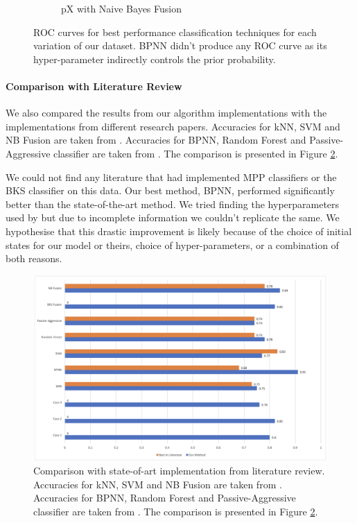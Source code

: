 \documentclass{article}
\begin{document}
\begin{figure}[h]
\begin{subfigure}{.4\columnwidth}
  \caption{pX with Naive Bayes Fusion}
\end{subfigure} \hfill

\caption{ROC curves for best performance classification techniques for each variation of our dataset. BPNN didn’t produce any ROC curve as its hyper-parameter indirectly controls the prior probability.}
\label{fig:grid1}
\end{figure}


\paragraph{Comparison with Literature Review}

We also compared the results from our algorithm implementations with the implementations from different research papers. Accuracies for kNN, SVM and NB Fusion are taken from \citet{gurfidan2021classification}. Accuracies for BPNN, Random Forest and Passive-Aggressive classifier are taken from \citet{chicco2020machine}. The comparison is presented in Figure \ref{fig:comparison}. 

We could not find any literature that had implemented MPP classifiers or the BKS classifier on this data. Our best method, BPNN, performed significantly better than the state-of-the-art method. We tried finding the hyperparameters used by \citet{chicco2020machine} but due to incomplete information we couldn't replicate the same. We hypothesise that this drastic improvement is likely because of the choice of initial states for our model or theirs, choice of hyper-parameters, or a combination of both reasons.

\begin{figure}
    \centering
    \includegraphics[width=\columnwidth]{comparison.png}
    \caption{Comparison with state-of-art implementation from literature review. Accuracies for kNN, SVM and NB Fusion are taken from \citet{gurfidan2021classification}. Accuracies for BPNN, Random Forest and Passive-Aggressive classifier are taken from \citet{chicco2020machine}. The comparison is presented in Figure \ref{fig:comparison}. }
    \label{fig:comparison}
\end{figure}
\end{document}
